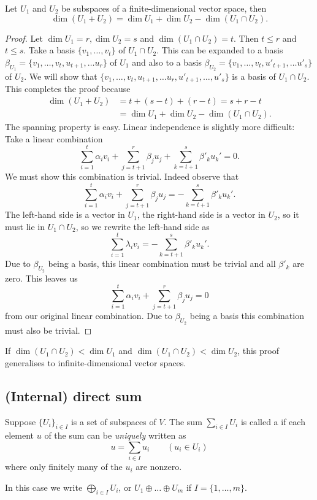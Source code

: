 \begin{theorem}
Let $U_1$ and $U_2$ be subspaces of a finite-dimensional vector space, then
\[ \dim(U_1 + U_2) = \dim U_1 + \dim U_2 - \dim(U_1\cap U_2). \]
\label{prop:dimOfASum}
\end{theorem}
\begin{proof}
Let $\dim U_1 = r, \dim U_2 = s$ and $\dim(U_1\cap U_2) = t$. Then $t\leq r$ and $t\leq s$.  Take a basis $\{v_1,\ldots, v_t\}$ of $U_1\cap U_2$. This can be expanded to a basis $\beta_{U_1} = \{ v_1, \ldots, v_t, u_{t+1}, \ldots u_{r} \}$ of $U_1$ and also to a basis $\beta_{U_2} = \{ v_1, \ldots, v_t, u'_{t+1}, \ldots u'_{s} \}$ of $U_2$. We will show that $\{ v_1, \ldots, v_t, u_{t+1}, \ldots u_{r}, u'_{t+1}, \ldots, u'_{s} \}$ is a basis of $U_1\cap U_2$. This completes the proof because
\begin{align*}
\dim(U_1 + U_2) &= t + (s-t) + (r-t) = s + r -t\\
&= \dim U_1 + \dim U_2 - \dim(U_1\cap U_2).
\end{align*}
The spanning property is easy. Linear independence is slightly more difficult: Take a linear combination
\[ \sum_{i=1}^t\alpha_i v_i + \sum^r_{j=t+1}\beta_ju_j + \sum^s_{k=t+1}\beta'_ku_k' =0. \]
We must show this combination is trivial. Indeed observe that
\[ \sum_{i=1}^t\alpha_i v_i + \sum^r_{j=t+1}\beta_ju_j  =-\sum^s_{k=t+1}\beta'_ku_k'. \]
The left-hand side is a vector in $U_1$, the right-hand side is a vector in $U_2$, so it must lie in $U_1\cap U_2$, so we rewrite the left-hand side as
\[ \sum_{i=1}^t\lambda_i v_i =  -\sum^s_{k=t+1}\beta'_ku_k'.\]
Due to $\beta_{U_2}$ being a basis, this linear combination must be trivial and all $\beta'_k$ are zero. This leaves us 
\[ \sum_{i=1}^t\alpha_i v_i + \sum^r_{j=t+1}\beta_ju_j =0 \]
from our original linear combination. Due to $\beta_{U_2}$ being a basis this combination must also be trivial. 
\end{proof}
\begin{note}
If $\dim(U_1\cap U_2)<\dim U_1$ and $\dim(U_1\cap U_2)< \dim U_2$, this proof generalises to infinite-dimensional vector spaces.
\end{note}

\subsection{(Internal) direct sum}
\begin{definition}
Suppose $\{U_i\}_{i\in I}$ is a set of subspaces of $V$. The sum $\sum_{i\in I}U_i$ is called a  if each element $u$ of the sum can be \emph{uniquely} written as
\[ u = \sum_{i\in I}u_i \qquad (u_i\in U_i) \]
where only finitely many of the $u_i$ are nonzero.

In this case we write $\bigoplus_{i\in I} U_i$, or $U_1 \oplus \ldots \oplus U_m$ if $I = \{1,\ldots, m\}$. 
\end{definition}

